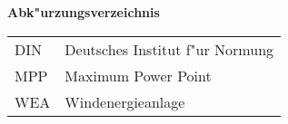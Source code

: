 \addtocounter{table}{-1} 
\bigskip
\Large \textsf{\textbf{Abk"urzungsverzeichnis}}
\begin{longtable}{p{2 cm}p{8 cm}} 
DIN & Deutsches Institut f"ur Normung \\
MPP & Maximum Power Point\\
WEA & Windenergieanlage
\end{longtable}